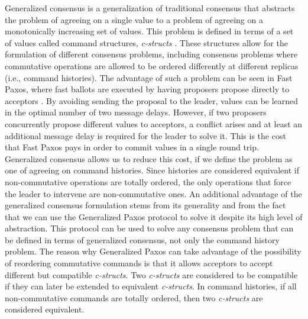 \documentclass[runningheads,a4paper]{llncs}
\begin{document}
Generalized consensus is a generalization of traditional consensus that abstracts the problem of agreeing on a single value to a problem of agreeing on a monotonically increasing set of values. This problem is defined in terms of a set of values called command structures, \textit{c-structs} \cite{Lamport2005}. These structures allow for the formulation of different consensus problems, including consensus problems where commutative operations are allowed to be ordered differently at different replicas (i.e., command histories). The advantage of such a problem can be seen in Fast Paxos, where fast ballots are executed by having proposers propose directly to acceptors \cite{Lamport2006}. By avoiding sending the proposal to the leader, values can be learned in the optimal number of two message delays. However, if two proposers concurrently propose different values to acceptors, a conflict arises and at least an additional message delay is required for the leader to solve it. This is the cost that Fast Paxos pays in order to commit values in a single round trip.  Generalized consensus allows us to reduce this cost, if we define the problem as one of agreeing on command histories. Since histories are considered equivalent if non-commutative operations are totally ordered, the only operations that force the leader to intervene are non-commutative ones. An additional advantage of the generalized consensus formulation stems from its generality and from the fact that we can use the Generalized Paxos protocol to solve it despite its high level of abstraction. This protocol can be used to solve any consensus problem that can be defined in terms of generalized consensus, not only the command history problem. The reason why Generalized Paxos can take advantage of the possibility of reordering commutative commands is that it allows acceptors to accept different but compatible \textit{c-structs}. Two \textit{c-structs} are considered to be compatible if they can later be extended to equivalent \textit{c-structs}. In command histories, if all non-commutative commands are totally ordered, then two \textit{c-structs} are considered equivalent. \par
\end{document}
